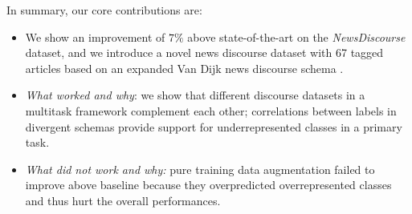\documentclass[11pt]{article}
\begin{document}

In summary, our core contributions are:

\begin{itemize}
  \item We show an improvement of $7\%$ above state-of-the-art on the \textit{NewsDiscourse} dataset, and we introduce a novel news discourse dataset with 67 tagged articles based on an expanded Van Dijk news discourse schema \cite{van2013news}.
  \item \textit{What worked and why}: we show that different discourse datasets in a multitask framework complement each other; correlations between labels in divergent schemas provide support for underrepresented classes in a primary task.
  \item \textit{What did not work and why:} pure training data augmentation failed to improve above baseline because they overpredicted overrepresented classes and thus hurt the overall performances.
\end{itemize}
\end{document}
